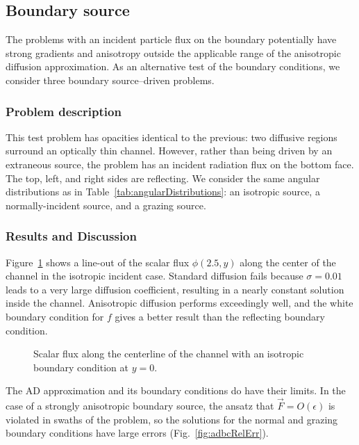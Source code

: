 \clearpage
\subsection{Boundary source}

The problems with an incident particle flux on the boundary potentially have
strong gradients and anisotropy outside the applicable range of the anisotropic
diffusion approximation. As an alternative test of the boundary conditions, we
consider three boundary source--driven problems.

\subsubsection{Problem description}

This test problem has opacities identical to the previous: two diffusive
regions surround an optically thin channel. However, rather than being driven
by an extraneous source, the problem has an incident radiation flux on the
bottom face. The top, left, and right sides are reflecting. We consider the same
angular distributions as in Table~\ref{tab:angularDistributions}: an isotropic
source, a normally-incident source, and a grazing source.

\subsubsection{Results and Discussion}

Figure~\ref{fig:adbcIsotropic} shows a line-out of the scalar flux $\phi(2.5,y)$
along the center of the channel in the isotropic incident case. Standard
diffusion fails because $\sigma=0.01$ leads to a very
large diffusion coefficient, resulting in a nearly constant solution inside the
channel. Anisotropic diffusion performs exceedingly well, and the
white boundary condition for $f$ gives a better result than the reflecting
boundary condition.

\begin{figure}[htb]
  \centering
  \centering\small
  \hspace{-.25in}%
  
  \caption{Scalar flux along the centerline of the channel with an isotropic
  boundary condition at $y=0$.}
  \label{fig:adbcIsotropic}
\end{figure}

The AD approximation and its boundary conditions do have their limits. In the
case of a strongly anisotropic boundary source, the ansatz that
$\vec{F} = O(\epsilon)$ is violated in swaths of the problem, so the solutions
for the normal and grazing boundary conditions have large errors
(Fig.~\ref{fig:adbcRelErr}).

